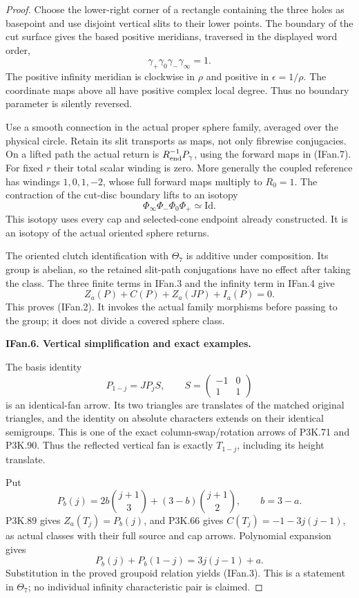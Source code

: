 \begin{proof}
Choose the lower-right corner of a rectangle containing the three
holes as basepoint and use disjoint vertical slits to their lower
points. The boundary of the cut surface gives the based positive
meridians, traversed in the displayed word order,
\[
 \gamma_+\gamma_0\gamma_-\gamma_\infty=1.            \tag{IFan.21}
\]
The positive infinity meridian is clockwise in \(\rho\) and positive
in \(\epsilon=1/\rho\). The coordinate maps above all have positive
complex local degree. Thus no boundary parameter is silently reversed.

Use a smooth connection in the actual proper sphere family, averaged
over the physical circle. Retain its slit transports as maps, not
only fibrewise conjugacies. On a lifted path the actual return is
\(R_{\rm end}^{-1}P_\gamma\), using the forward maps in (IFan.7).
For fixed \(r\) their total scalar winding is zero. More generally
the coupled reference has windings \(1,0,1,-2\), whose full forward
maps multiply to \(R_0=1\). The contraction of the cut-disc boundary
lifts to an isotopy
\[
 \Phi_\infty\Phi_-\Phi_0\Phi_+\simeq\mathrm{Id}.    \tag{IFan.22}
\]
This isotopy uses every cap and selected-cone endpoint already
constructed. It is an isotopy of the actual oriented sphere returns.

The oriented clutch identification with \(\Theta_7\) is additive
under composition. Its group is abelian, so the retained slit-path
conjugations have no effect after taking the class. The three finite
terms in IFan.3 and the infinity term in IFan.4 give
\[
 Z_a(P)+C(P)+Z_a(JP)+I_a(P)=0.
\]
This proves (IFan.2). It invokes the actual family morphisms before
passing to the group; it does not divide a covered sphere class.

\par\medskip\noindent\textbf{IFan.6. Vertical simplification and exact examples.}\par\nopagebreak[4]

The basis identity
\[
 P_{1-j}=J P_j S,\qquad
 S=\begin{pmatrix}-1&0\\1&1\end{pmatrix}
\]
is an identical-fan arrow. Its two triangles are translates of the
matched original triangles, and the identity on absolute characters
extends on their identical semigroups. This is one of the exact
column-swap/rotation arrows of P3K.71 and P3K.90. Thus the reflected
vertical fan is exactly \(T_{1-j}\), including its height translate.

Put
\[
 P_b(j)=2b\binom{j+1}{3}+(3-b)\binom{j+1}{2},\qquad b=3-a.
\]
P3K.89 gives \(Z_a(T_j)=P_b(j)\), and P3K.66 gives
\(C(T_j)=-1-3j(j-1)\), as actual classes with their full source
and cap arrows. Polynomial expansion gives
\[
 P_b(j)+P_b(1-j)=3j(j-1)+a.
\]
Substitution in the proved groupoid relation yields (IFan.3).
This is a statement in \(\Theta_7\); no individual infinity
characteristic pair is claimed.


\end{proof}
